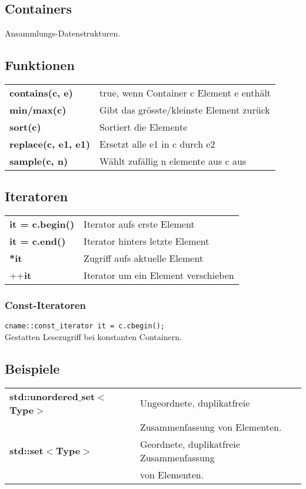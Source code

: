 \documentclass[a3paper, 10pt, landscape]{scrartcl}
\newcommand{\code}[1]{\texttt{#1}}
\begin{document}
\begin{multicols*}{3}

\section{Containers}
	Ansammlungs-Datenstrukturen.
	
	\subsection{Funktionen}
	\begin{tabular}{l l}
	\textbf{contains(c, e)} & true, wenn Container c Element e enthält \\
	\textbf{min/max(c)} & Gibt das grösste/kleinste Element zurück \\
		\textbf{sort(c)} & Sortiert die Elemente \\
		\textbf{replace(c, e1, e1)} & Ersetzt alle e1 in c durch e2 \\
		\textbf{sample(c, n)} & Wählt zufällig n elemente aus c aus
	\end{tabular}
	
	\subsection{Iteratoren}
	\begin{tabular}{l l}
	\textbf{it = c.begin()} & Iterator aufs erste Element \\
	\textbf{it = c.end()} & Iterator hinters letzte Element \\
	\textbf{*it} & Zugriff aufs aktuelle Element \\
	++\textbf{it} & Iterator um ein Element verschieben
		
	\end{tabular}
	
	\subsubsection{Const-Iteratoren}
	\vspace{0.1cm}
	\code{cname::const\_iterator it = c.cbegin();}\\
	Gestatten Lesezugriff bei konstanten Containern.
	\subsection{Beispiele}
	\begin{tabular}{l l}
		\textbf{std::unordered$\_$set$<$Type$>$} & Ungeordnete, duplikatfreie  \\
		& Zusammenfassung von Elementen. \\
		\textbf{std::set$<$Type$>$} & Geordnete, duplikatfreie Zusammenfassung \\
		& von Elementen. \\
	\end{tabular}



\end{multicols*}
\end{document}

